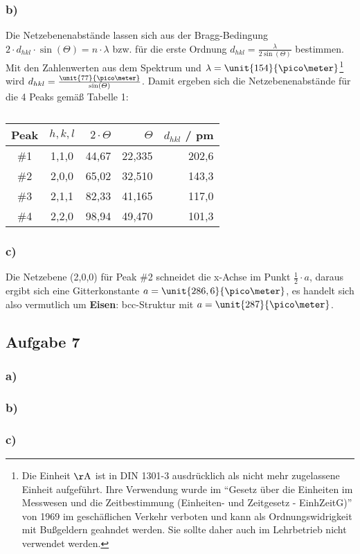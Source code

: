 \documentclass[11pt]{article}
\begin{document}
\subsubsection*{b)}
Die Netzebenenabstände lassen sich aus der Bragg-Bedingung
$2 \cdot d_{hkl} \cdot \sin(\varTheta) = n \cdot \lambda$ bzw. für die erste Ordnung
$d_{hkl} = \frac{\lambda}{2 \sin(\varTheta)}$ bestimmen. Mit den Zahlenwerten aus dem
Spektrum und $\lambda =\unit{154}{\pico \meter}$\footnote{Die Einheit $\mathrm{\AA}$
ist in DIN 1301-3 ausdrücklich als nicht mehr zugelassene Einheit aufgeführt.
Ihre Verwendung wurde im "`Gesetz über die Einheiten im Messwesen und die
Zeitbestimmung (Einheiten- und Zeitgesetz - EinhZeitG)"' von 1969 im
geschäflichen Verkehr verboten und kann als Ordnungswidrigkeit mit
Bußgeldern geahndet werden. Sie sollte daher auch im Lehrbetrieb nicht verwendet werden.}
wird $d_{hkl} = \frac{\unit{77}{\pico \meter}}{\sin(\varTheta)}$.
Damit ergeben sich die Netzebenenabstände für die 4 Peaks gemäß Tabelle 1:
\begin{table}[htbp]
\caption{}
\begin{center}
\begin{tabular}{|c|c|r|r|r|}
\hline
Peak & $h,k,l$ & $ 2 \cdot \varTheta $ & $ \varTheta $ & $d_{hkl}$ / pm \\ \hline \hline
\#1 & 1,1,0 & 44,67 & 22,335 & 202,6 \\ \hline
\#2 & 2,0,0 & 65,02 & 32,510 & 143,3 \\ \hline
\#3 & 2,1,1 & 82,33 & 41,165 & 117,0 \\ \hline
\#4 & 2,2,0 & 98,94 & 49,470 & 101,3 \\ \hline
\end{tabular}
\end{center}
\label{}
\end{table}

\subsubsection*{c)}
Die Netzebene (2,0,0) für Peak \#2 schneidet die x-Achse im Punkt
$\frac{1}{2} \cdot a$, daraus ergibt sich eine Gitterkonstante
$a = \unit{286,6}{\pico \meter}$, es handelt sich also vermutlich um
\textbf{Eisen}: bcc-Struktur mit $a = \unit{287}{\pico \meter}$.

\subsection*{Aufgabe 7}
\subsubsection*{a)}

\subsubsection*{b)}

\subsubsection*{c)}
\end{document}
